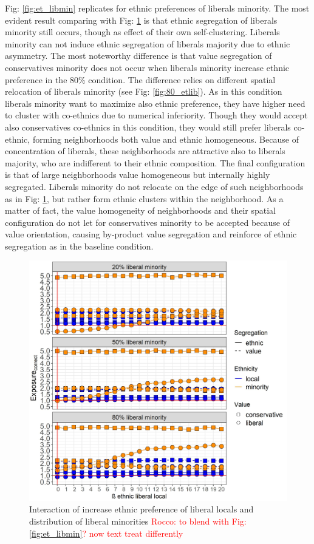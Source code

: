 \documentclass{article}
\newcommand{\rocco}[1]{{\textcolor{red}{Rocco: #1}}} %
\begin{document}
Fig: \ref{fig:et_libmin} replicates for ethnic preferences of liberals minority. The most evident result comparing with Fig: \ref{fig:et_libloc} is that ethnic segregation of liberals minority still occurs, though as effect of their own self-clustering. Liberals minority can not induce ethnic segregation of liberals majority due to ethnic asymmetry. The most noteworthy difference is that value segregation of conservatives minority does not occur when liberals minority increase ethnic preference in the $80 \%$ condition. The difference relies on different spatial relocation of liberals minority (see Fig: \ref{fig:80_etlib}). As in this condition liberals minority want to maximize also ethnic preference, they have higher need to cluster with co-ethnics due to numerical inferiority. Though they would accept also conservatives co-ethnics in this condition, they would still prefer liberals co-ethnic, forming neighborhoods both value and ethnic homogeneous. Because of concentration of liberals, these neighborhoods are attractive also to liberals majority, who are indifferent to their ethnic composition. The final configuration is that of large neighborhoods value homogeneous but internally highly segregated. Liberals minority do not relocate on the edge of such neighborhoods as in Fig: \ref{fig:et_libloc}, but rather form ethnic clusters within the neighborhood. As a matter of fact, the value homogeneity of neighborhoods and their spatial configuration do not let for conservatives minority to be accepted because of value orientation, causing by-product value segregation and reinforce of ethnic segregation as in the baseline condition. 


\begin{figure}[H]
    \centering
    \includegraphics[scale=0.5]{material/figures/et_libloc.jpg}
    \caption{Interaction of increase ethnic preference of liberal locals and distribution of liberal minorities \rocco{to blend with Fig: \ref{fig:et_libmin}? now text treat differently}}
    \label{fig:et_libloc}
\end{figure} %
\end{document}
